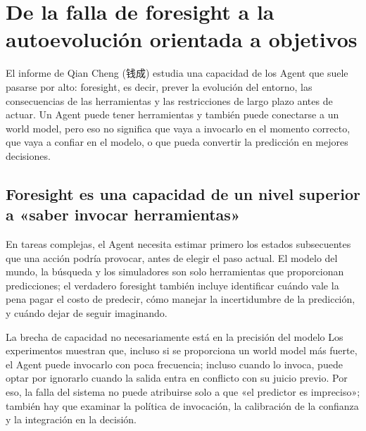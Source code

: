 \section{De la falla de foresight a la autoevolución orientada a objetivos}

El informe de Qian Cheng (钱成) estudia una capacidad de los Agent que suele pasarse por alto: foresight, es decir, prever la evolución del entorno, las consecuencias de las herramientas y las restricciones de largo plazo antes de actuar. Un Agent puede tener herramientas y también puede conectarse a un world model, pero eso no significa que vaya a invocarlo en el momento correcto, que vaya a confiar en el modelo, o que pueda convertir la predicción en mejores decisiones.


\subsection{Foresight es una capacidad de un nivel superior a «saber invocar herramientas»}

En tareas complejas, el Agent necesita estimar primero los estados subsecuentes que una acción podría provocar, antes de elegir el paso actual. El modelo del mundo, la búsqueda y los simuladores son solo herramientas que proporcionan predicciones; el verdadero foresight también incluye identificar cuándo vale la pena pagar el costo de predecir, cómo manejar la incertidumbre de la predicción, y cuándo dejar de seguir imaginando.



\begin{importantbox}{La brecha de capacidad no necesariamente está en la precisión del modelo}
Los experimentos muestran que, incluso si se proporciona un world model más fuerte, el Agent puede invocarlo con poca frecuencia; incluso cuando lo invoca, puede optar por ignorarlo cuando la salida entra en conflicto con su juicio previo. Por eso, la falla del sistema no puede atribuirse solo a que «el predictor es impreciso»; también hay que examinar la política de invocación, la calibración de la confianza y la integración en la decisión.
\end{importantbox}

